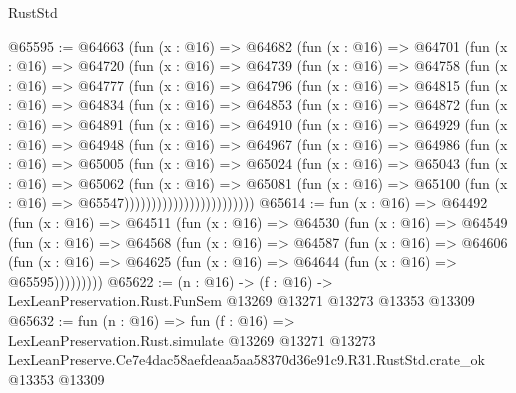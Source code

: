 \begin{lexlean}{RustStd}
\begin{coremodule}
@65595 := @64663
    (fun (x : @16) =>
    @64682
      (fun (x : @16) =>
      @64701
        (fun (x : @16) =>
        @64720
          (fun (x : @16) =>
          @64739
            (fun (x : @16) =>
            @64758
              (fun (x : @16) =>
              @64777
                (fun (x : @16) =>
                @64796
                  (fun (x : @16) =>
                  @64815
                    (fun (x : @16) =>
                    @64834
                      (fun (x : @16) =>
                      @64853
                        (fun (x : @16) =>
                        @64872
                          (fun (x : @16) =>
                          @64891
                            (fun (x : @16) =>
                            @64910
                              (fun (x : @16) =>
                              @64929
                                (fun (x : @16) =>
                                @64948
                                  (fun (x : @16) =>
                                  @64967
                                    (fun (x : @16) =>
                                    @64986
                                      (fun (x : @16) =>
                                      @65005
                                        (fun (x : @16) =>
                                        @65024
                                          (fun (x : @16) =>
                                          @65043
                                            (fun (x : @16) =>
                                            @65062
                                              (fun (x : @16) =>
                                              @65081
                                                (fun (x : @16) =>
                                                @65100
                                                  (fun (x : @16) => @65547))))))))))))))))))))))))
@65614 := fun (x : @16) =>
  @64492
    (fun (x : @16) =>
    @64511
      (fun (x : @16) =>
      @64530
        (fun (x : @16) =>
        @64549
          (fun (x : @16) =>
          @64568
            (fun (x : @16) =>
            @64587
              (fun (x : @16) =>
              @64606
                (fun (x : @16) => @64625 (fun (x : @16) => @64644 (fun (x : @16) => @65595)))))))))
@65622 := (n : @16) ->
  (f : @16) -> LexLeanPreservation.Rust.FunSem @13269 @13271 @13273 @13353 @13309
@65632 := fun (n : @16) =>
  fun (f : @16) =>
  LexLeanPreservation.Rust.simulate
    @13269
    @13271
    @13273
    LexLeanPreserve.Ce7e4dac58aefdeaa5aa58370d36e91c9.R31.RustStd.crate_ok
    @13353
    @13309
\end{coremodule}
\end{lexlean}
